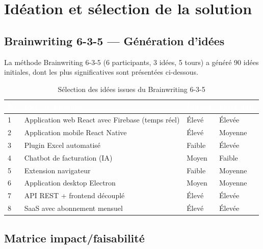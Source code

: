 \documentclass[12pt,a4paper]{report}
\begin{document}
\section{Idéation et sélection de la solution}

\subsection{Brainwriting 6-3-5 — Génération d'idées}

La méthode Brainwriting 6-3-5 (6 participants, 3 idées, 5 tours) a généré 90 idées initiales, dont les plus significatives sont présentées ci-dessous.

\begin{table}[H]
\centering
\caption{Sélection des idées issues du Brainwriting 6-3-5}
\label{tab:brainwriting}
\begin{tabularx}{\textwidth}{|l|X|l|l|}
\hline
\rowcolor{emsiblue}\textcolor{white}{\textbf{N°}} & \textcolor{white}{\textbf{Idée de solution}} & \textcolor{white}{\textbf{Impact}} & \textcolor{white}{\textbf{Faisabilité}} \\
\hline
1 & Application web React avec Firebase (temps réel) & Élevé & Élevée \\
2 & Application mobile React Native & Élevé & Moyenne \\
3 & Plugin Excel automatisé & Faible & Élevée \\
4 & Chatbot de facturation (IA) & Moyen & Faible \\
5 & Extension navigateur & Faible & Moyenne \\
6 & Application desktop Electron & Moyen & Moyenne \\
7 & API REST + frontend découplé & Élevé & Élevée \\
8 & SaaS avec abonnement mensuel & Élevé & Élevée \\
\hline
\end{tabularx}
\end{table}

\subsection{Matrice impact/faisabilité}
\end{document}
